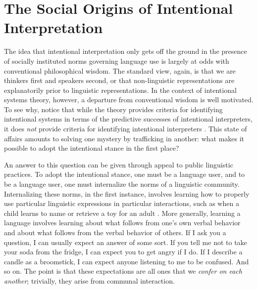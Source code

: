 \section{The Social Origins of Intentional Interpretation}

The idea that intentional interpretation only gets off the ground in the presence of socially instituted norms governing language use is largely at odds with conventional philosophical wisdom. The standard view, again, is that we are thinkers first and speakers second, or that non-linguistic representations are explanatorily prior to linguistic representations. In the context of intentional systems theory, however, a departure from conventional wisdom is well motivated. To see why, notice that while the theory provides criteria for identifying intentional systems in terms of the predictive successes of intentional interpreters, it does \textit{not} provide criteria for identifying intentional interpreters \citep[][p. 57-59]{Brandom:1994}. This state of affairs amounts to solving one mystery by trafficking in another: what makes it possible to adopt the intentional stance in the first place?

An answer to this question can be given through appeal to public linguistic practices. To adopt the intentional stance, one must be a language user, and to be a language user, one must internalize the norms of a linguistic community. Internalizing these norms, in the first instance, involves learning how to properly use particular linguistic expressions in particular interactions, such as when a child learns to name or retrieve a toy for an adult \citep[][]{Tomasello:2005}. More generally, learning a language involves learning about what follows from one's own verbal behavior and about what follows from the verbal behavior of others. If I ask you a question, I can usually expect an answer of some sort. If you tell me not to take your soda from the fridge, I can expect you to get angry if I do. If I describe a candle as a broomstick, I can expect anyone listening to me to be confused. And so on. The point is that these expectations are all ones that we \textit{confer on each another}; trivially, they arise from communal interaction.

